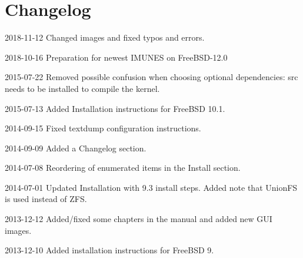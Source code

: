 \chapter{Changelog}
2018-11-12
Changed images and fixed typos and errors.

2018-10-16
Preparation for newest IMUNES on FreeBSD-12.0

2015-07-22
Removed possible confusion when choosing optional dependencies: src needs to be
installed to compile the kernel.

2015-07-13
Added Installation instructions for FreeBSD 10.1.

2014-09-15
Fixed textdump configuration instructions.

2014-09-09
Added a Changelog section.

2014-07-08
Reordering of enumerated items in the Install section.

2014-07-01
Updated Installation with 9.3 install steps.
Added note that UnionFS is used instead of ZFS.

2013-12-12
Added/fixed some chapters in the manual and added new GUI images.

2013-12-10
Added installation instructions for FreeBSD 9.
